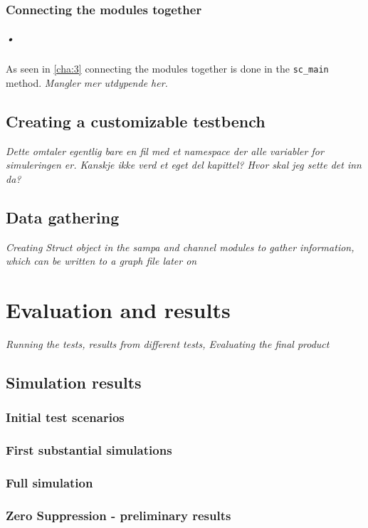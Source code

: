 \documentclass[a4paper, 12pt]{report}
\newcommand{\codeword}[1]{\texttt{#1}}
\begin{document}
\subsection{Connecting the modules together}
\paragraph{•}
As seen in \ref{cha:3} connecting the modules together is done in the \codeword{sc\_main} method.
\textit{Mangler mer utdypende her.}

\section{Creating a customizable testbench}
\textit{Dette omtaler egentlig bare en fil med et namespace der alle variabler for simuleringen er. Kanskje ikke verd et eget del kapittel? Hvor skal jeg sette det inn da?}

\section{Data gathering}
\textit{Creating Struct object in the sampa and channel modules to gather information, which can be written to a graph file later on}

\chapter{Evaluation and results}
\textit{Running the tests, results from different tests, Evaluating the final product}
\section{Simulation results}
\subsection{Initial test scenarios}
\subsection{First substantial simulations}
\subsection{Full simulation}

\subsection{Zero Suppression - preliminary results}
\end{document}
